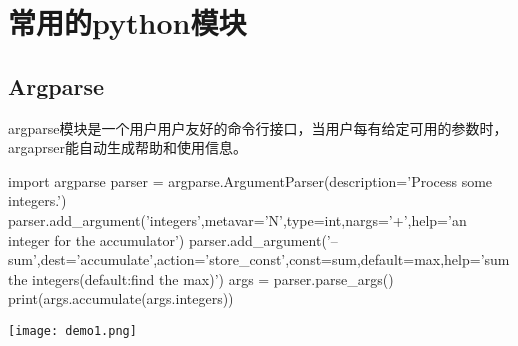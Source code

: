 \chapter{常用的python模块}
\section{Argparse}
argparse模块是一个用户用户友好的命令行接口，当用户每有给定可用的参数时，argaprser能自动生成帮助和使用信息。
\begin{python}
import argparse
parser = argparse.ArgumentParser(description='Process some integers.')
parser.add_argument('integers',metavar='N',type=int,nargs='+',help='an integer for the accumulator')
parser.add_argument('--sum',dest='accumulate',action='store_const',const=sum,default=max,help='sum the integers(default:find the max)')
args = parser.parse_args()
print(args.accumulate(args.integers))
\end{python}
\texttt{[image: demo1.png]}
